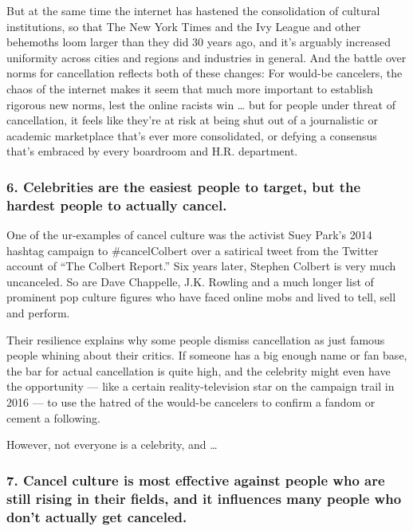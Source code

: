 But at the same time the internet has hastened the consolidation of
cultural institutions, so that The New York Times and the Ivy League and
other behemoths loom larger than they did 30 years ago, and it's
arguably increased uniformity across cities and regions and industries
in general. And the battle over norms for cancellation reflects both of
these changes: For would-be cancelers, the chaos of the internet makes
it seem that much more important to establish rigorous new norms, lest
the online racists win \ldots{} but for people under threat of
cancellation, it feels like they're at risk at being shut out of a
journalistic or academic marketplace that's ever more consolidated, or
defying a consensus that's embraced by every boardroom and H.R.
department.

\hypertarget{6-celebrities-are-the-easiest-people-to-target-but-the-hardest-people-to-actually-cancel}{%
\subsubsection{6. Celebrities are the easiest people to target, but the
hardest people to actually
cancel.}\label{6-celebrities-are-the-easiest-people-to-target-but-the-hardest-people-to-actually-cancel}}

One of the ur-examples of cancel culture was the activist Suey Park's
2014 hashtag campaign to \#cancelColbert over a satirical tweet from the
Twitter account of ``The Colbert Report.'' Six years later, Stephen
Colbert is very much uncanceled. So are Dave Chappelle, J.K. Rowling and
a much longer list of prominent pop culture figures who have faced
online mobs and lived to tell, sell and perform.

Their resilience explains why some people dismiss cancellation as just
famous people whining about their critics. If someone has a big enough
name or fan base, the bar for actual cancellation is quite high, and the
celebrity might even have the opportunity --- like a certain
reality-television star on the campaign trail in 2016 --- to use the
hatred of the would-be cancelers to confirm a fandom or cement a
following.

However, not everyone is a celebrity, and \ldots{}

\hypertarget{7-cancel-culture-is-most-effective-against-people-who-are-still-rising-in-their-fields-and-it-influences-many-people-who-dont-actually-get-canceled}{%
\subsubsection{7. Cancel culture is most effective against people who
are still rising in their fields, and it influences many people who
don't actually get
canceled.}\label{7-cancel-culture-is-most-effective-against-people-who-are-still-rising-in-their-fields-and-it-influences-many-people-who-dont-actually-get-canceled}}

